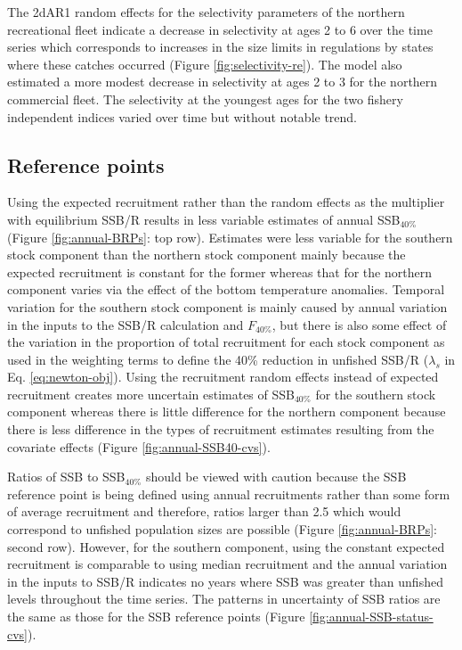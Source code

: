 \documentclass[
]{article}
\begin{document}
The 2dAR1 random effects for the selectivity parameters of the northern
recreational fleet indicate a decrease in selectivity at ages 2 to 6
over the time series which corresponds to increases in the size limits
in regulations by states where these catches occurred (Figure
\ref{fig:selectivity-re}). The model also estimated a more modest
decrease in selectivity at ages 2 to 3 for the northern commercial
fleet. The selectivity at the youngest ages for the two fishery
independent indices varied over time but without notable trend.

\hypertarget{reference-points-1}{%
\subsection*{Reference points}\label{reference-points-1}}

Using the expected recruitment rather than the random effects as the
multiplier with equilibrium SSB/R results in less variable estimates of
annual SSB\(_{40\%}\) (Figure \ref{fig:annual-BRPs}: top row). Estimates
were less variable for the southern stock component than the northern
stock component mainly because the expected recruitment is constant for
the former whereas that for the northern component varies via the effect
of the bottom temperature anomalies. Temporal variation for the southern
stock component is mainly caused by annual variation in the inputs to
the SSB/R calculation and \(F_{40\%}\), but there is also some effect of
the variation in the proportion of total recruitment for each stock
component as used in the weighting terms to define the 40\% reduction in
unfished SSB/R (\(\lambda_s\) in Eq. \ref{eq:newton-obj}). Using the
recruitment random effects instead of expected recruitment creates more
uncertain estimates of SSB\(_{40\%}\) for the southern stock component
whereas there is little difference for the northern component because
there is less difference in the types of recruitment estimates resulting
from the covariate effects (Figure \ref{fig:annual-SSB40-cvs}).

Ratios of SSB to SSB\(_{40\%}\) should be viewed with caution because
the SSB reference point is being defined using annual recruitments
rather than some form of average recruitment and therefore, ratios
larger than 2.5 which would correspond to unfished population sizes are
possible (Figure \ref{fig:annual-BRPs}: second row). However, for the
southern component, using the constant expected recruitment is
comparable to using median recruitment and the annual variation in the
inputs to SSB/R indicates no years where SSB was greater than unfished
levels throughout the time series. The patterns in uncertainty of SSB
ratios are the same as those for the SSB reference points (Figure
\ref{fig:annual-SSB-status-cvs}).
\end{document}
